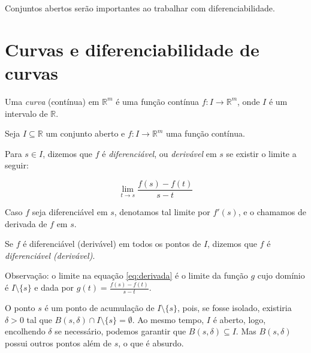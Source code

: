 
Conjuntos abertos serão importantes ao trabalhar com diferenciabilidade.
\section{Curvas e diferenciabilidade de curvas}
\begin{definition}
Uma \emph{curva} (contínua) em $\mathbb R^m$ é uma função contínua $f: I\rightarrow \mathbb R^m$, onde $I$ é um intervalo de $\mathbb R$.
\end{definition}

\begin{definition}
    Seja $I\subseteq \mathbb R$ um conjunto aberto e $f: I\rightarrow \mathbb R^m$ uma função contínua.

    Para $s \in I$, dizemos que $f$ é \emph{diferenciável}, ou \emph{derivável} em $s$ se existir o limite a seguir:

    \begin{equation}\label{eq:derivada}
        \lim_{t \to s} \frac{f(s)-f(t)}{s-t}
    \end{equation}

    Caso $f$ seja diferenciável em $s$, denotamos tal limite por $f'(s)$, e o chamamos de derivada de $f$ em $s$.

    Se $f$ é diferenciável (derivável) em todos os pontos de $I$, dizemos que $f$ é \emph{diferenciável (derivável)}.
\end{definition}

Observação: o limite na equação \eqref{eq:derivada} é o limite da função $g$ cujo domínio é $I\setminus \{s\}$ e dada por $g(t) = \frac{f(s)-f(t)}{s-t}$.

O ponto $s$ é um ponto de acumulação de $I\setminus\{s\}$, pois, se fosse isolado, existiria $\delta>0$ tal que $B(s, \delta)\cap I\setminus\{s\}=\emptyset$.
Ao mesmo tempo, $I$ é aberto, logo, encolhendo $\delta$ se necessário, podemos garantir que $B(s, \delta)\subseteq I$.
Mas $B(s, \delta)$ possui outros pontos além de $s$, o que é absurdo.

